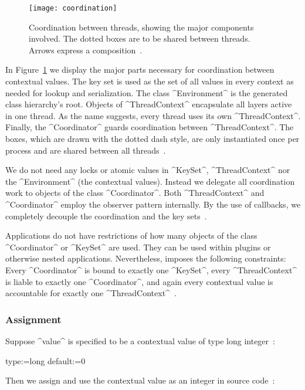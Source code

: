 \begin{figure}[htp]
\centering
\texttt{[image: coordination]}
\caption[Coordination between threads.]{Coordination between threads, showing the major components involved. The dotted boxes are to be shared between threads. Arrows express a composition~\cite{raab2015global}.}
\label{fig:coordination}
\end{figure}

In Figure~\ref{fig:coordination} we display the major parts necessary for coordination between contextual values.
The key set is used as the set of all values in every context as needed for lookup and serialization.
The class ^Environment^ is the generated class hierarchy's root.
Objects of ^ThreadContext^ encapsulate all layers active in one thread.
As the name suggests, every thread uses its own ^ThreadContext^.
Finally, the ^Coordinator^ guards coordination between ^ThreadContext^.
The boxes, which are drawn with the dotted dash style, are only instantiated once per process and are shared between all threads~\cite{raab2015global}.

We do not need any locks or atomic values in ^KeySet^, ^ThreadContext^ nor the ^Environment^ (the contextual values).
Instead we delegate all coordination work to objects of the class ^Coordinator^.
Both ^ThreadContext^ and ^Coordinator^ employ the observer pattern internally.
By the use of callbacks, we completely decouple the coordination and the key sets~\cite{raab2015global}.

Applications do not have restrictions of how many objects of the class ^Coordinator^ or ^KeySet^ are used.
They can be used within plugins or otherwise nested applications.
Nevertheless, \elektra{} imposes the following constraints:
Every ^Coordinator^ is bound to exactly one ^KeySet^, every ^ThreadContext^ is liable to exactly one ^Coordinator^, and again every contextual value is accountable for exactly one ^ThreadContext^~\cite{raab2015global}.

\subsubsection{Assignment}

Suppose ^value^ is specified to be a contextual value of type long integer~\cite{raab2015global}:

\begin{code}
[value]
  type:=long
  default:=0
\end{code}

Then we assign and use the contextual value as an integer in source code~\cite{raab2015global}:

